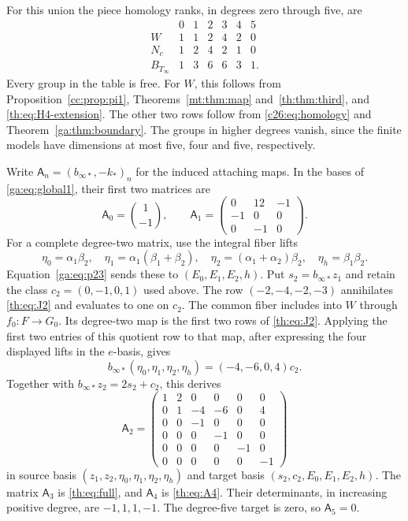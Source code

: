 For this union the piece homology ranks, in degrees zero through five,
are
\begin{equation}\label{th:eq:piece-ranks}
\begin{array}{c|rrrrrr}
 &0&1&2&3&4&5\\\hline
 W&1&1&2&4&2&0\\
 N_c&1&2&4&2&1&0\\
 B_{T_\infty}&1&3&6&6&3&1.
\end{array}
\end{equation}
Every group in the table is free.
For $W$, this follows from Proposition~\ref{cc:prop:pi1},
Theorems~\ref{mt:thm:map} and~\ref{th:thm:third}, and
\eqref{th:eq:H4-extension}. The other two rows follow from
\eqref{c26:eq:homology} and Theorem~\ref{ga:thm:boundary}.
The groups in higher degrees vanish, since the finite models have
dimensions at most five, four and five, respectively.

Write $\mathsf A_n=(b_{\infty*},-k_*)_n$ for the induced attaching maps.
In the bases of \eqref{ga:eq:global1}, their first two matrices are
\[
 \mathsf A_0=\binom{1}{-1},\qquad
 \mathsf A_1=\begin{pmatrix}0&12&-1\\-1&0&0\\0&-1&0\end{pmatrix}.
\]
For a complete degree-two matrix, use the integral fiber lifts
\[
 \eta_0=\alpha_1\beta_2,\quad
 \eta_1=\alpha_1(\beta_1+\beta_2),\quad
 \eta_2=(\alpha_1+\alpha_2)\beta_2,\quad
 \eta_h=\beta_1\beta_2.
\]
Equation~\eqref{ga:eq:p23} sends these to $(E_0,E_1,E_2,h)$.
Put $s_2=b_{\infty*}z_1$ and retain the class
$c_2=(0,-1,0,1)$ used above. The row $(-2,-4,-2,-3)$ annihilates
\eqref{th:eq:J2} and evaluates to one on $c_2$.
The common fiber includes into $W$ through $f_0:F\to G_0$.
Its degree-two map is the first two rows of \eqref{th:eq:J2}.
Applying the first two entries of this quotient row to that map,
after expressing the four displayed lifts in the $e$-basis, gives
\[
 b_{\infty*}(\eta_0,\eta_1,\eta_2,\eta_h)=(-4,-6,0,4)c_2.
\]
Together with $b_{\infty*}z_2=2s_2+c_2$, this derives
\begin{equation}\label{th:eq:A2}
 \mathsf A_2=
 \begin{pmatrix}
 1&2&0&0&0&0\\
 0&1&-4&-6&0&4\\
 0&0&-1&0&0&0\\
 0&0&0&-1&0&0\\
 0&0&0&0&-1&0\\
 0&0&0&0&0&-1
 \end{pmatrix}
\end{equation}
in source basis $(z_1,z_2,\eta_0,\eta_1,\eta_2,\eta_h)$ and target
basis $(s_2,c_2,E_0,E_1,E_2,h)$.
The matrix $\mathsf A_3$ is \eqref{th:eq:full}, and $\mathsf A_4$ is
\eqref{th:eq:A4}. Their determinants, in increasing positive degree,
are $-1,1,1,-1$. The degree-five target is zero, so $\mathsf A_5=0$.

